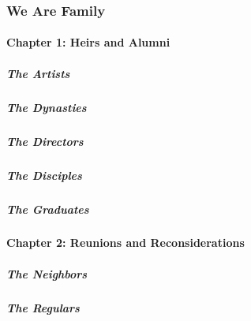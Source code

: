 \hypertarget{we-are-family-1}{%
\subsubsection{We Are Family}\label{we-are-family-1}}

\hypertarget{chapter-1-heirs-and-alumni}{%
\paragraph{Chapter 1: Heirs and
Alumni}\label{chapter-1-heirs-and-alumni}}

\href{/interactive/2020/04/13/t-magazine/black-art-galleries.html}{}

\hypertarget{the-artists}{%
\subparagraph{The Artists}\label{the-artists}}

\href{/interactive/2020/04/13/t-magazine/italian-fashion-design-houses.html}{}

\hypertarget{the-dynasties}{%
\subparagraph{The Dynasties}\label{the-dynasties}}

\href{/interactive/2020/04/13/t-magazine/gordon-parks.html}{}

\hypertarget{the-directors}{%
\subparagraph{The Directors}\label{the-directors}}

\href{/interactive/2020/04/13/t-magazine/enrique-olvera-chef.html}{}

\hypertarget{the-disciples}{%
\subparagraph{The Disciples}\label{the-disciples}}

\href{/interactive/2020/04/13/t-magazine/royal-academy-antwerp.html}{}

\hypertarget{the-graduates}{%
\subparagraph{The Graduates}\label{the-graduates}}

\hypertarget{chapter-2-reunions-and-reconsiderations-1}{%
\paragraph{Chapter 2: Reunions and
Reconsiderations}\label{chapter-2-reunions-and-reconsiderations-1}}

\href{/interactive/2020/04/13/t-magazine/ninth-street-greenwich-village-neighbors.html}{}

\hypertarget{the-neighbors}{%
\subparagraph{The Neighbors}\label{the-neighbors}}

\href{/interactive/2020/04/13/t-magazine/omen-restaurant-nyc.html}{}

\hypertarget{the-regulars}{%
\subparagraph{The Regulars}\label{the-regulars}}

